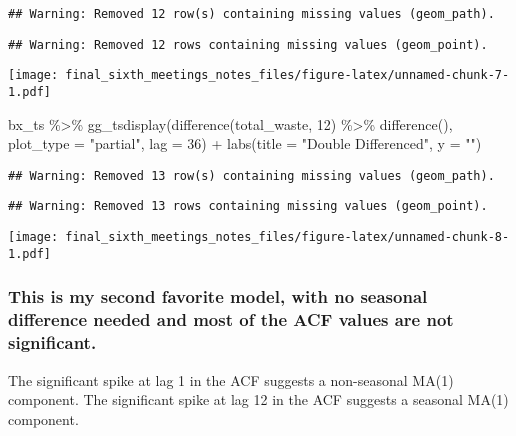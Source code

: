 \documentclass[
]{article}
\newenvironment{Shaded}{\begin{snugshade}}{\end{snugshade}}
\newcommand{\AttributeTok}[1]{\textcolor[rgb]{0.77,0.63,0.00}{#1}}
\newcommand{\DecValTok}[1]{\textcolor[rgb]{0.00,0.00,0.81}{#1}}
\newcommand{\FunctionTok}[1]{\textcolor[rgb]{0.00,0.00,0.00}{#1}}
\newcommand{\NormalTok}[1]{#1}
\newcommand{\SpecialCharTok}[1]{\textcolor[rgb]{0.00,0.00,0.00}{#1}}
\newcommand{\StringTok}[1]{\textcolor[rgb]{0.31,0.60,0.02}{#1}}
\begin{document}
\begin{verbatim}
## Warning: Removed 12 row(s) containing missing values (geom_path).
\end{verbatim}

\begin{verbatim}
## Warning: Removed 12 rows containing missing values (geom_point).
\end{verbatim}

\texttt{[image: final\_sixth\_meetings\_notes\_files/figure-latex/unnamed-chunk-7-1.pdf]}

\begin{Shaded}
\begin{Highlighting}[]
\NormalTok{bx\_ts }\SpecialCharTok{\%\textgreater{}\%} 
  \FunctionTok{gg\_tsdisplay}\NormalTok{(}\FunctionTok{difference}\NormalTok{(total\_waste, }\DecValTok{12}\NormalTok{) }\SpecialCharTok{\%\textgreater{}\%} \FunctionTok{difference}\NormalTok{(),}
               \AttributeTok{plot\_type =} \StringTok{"partial"}\NormalTok{, }\AttributeTok{lag =} \DecValTok{36}\NormalTok{) }\SpecialCharTok{+}
  \FunctionTok{labs}\NormalTok{(}\AttributeTok{title =} \StringTok{"Double Differenced"}\NormalTok{, }\AttributeTok{y =} \StringTok{""}\NormalTok{)}
\end{Highlighting}
\end{Shaded}

\begin{verbatim}
## Warning: Removed 13 row(s) containing missing values (geom_path).
\end{verbatim}

\begin{verbatim}
## Warning: Removed 13 rows containing missing values (geom_point).
\end{verbatim}

\texttt{[image: final\_sixth\_meetings\_notes\_files/figure-latex/unnamed-chunk-8-1.pdf]}

\hypertarget{this-is-my-second-favorite-model-with-no-seasonal-difference-needed-and-most-of-the-acf-values-are-not-significant.}{%
\subsubsection{This is my second favorite model, with no seasonal
difference needed and most of the ACF values are not
significant.}\label{this-is-my-second-favorite-model-with-no-seasonal-difference-needed-and-most-of-the-acf-values-are-not-significant.}}

The significant spike at lag 1 in the ACF suggests a non-seasonal MA(1)
component. The significant spike at lag 12 in the ACF suggests a
seasonal MA(1) component.
\end{document}
